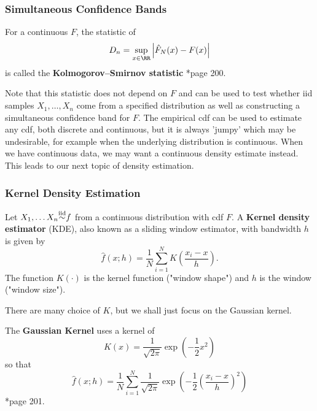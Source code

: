 \subsubsection*{Simultaneous Confidence Bands}


\begin{defe} \label{defe: TBD}
    For a continuous $F$, the statistic of
    \begin{equation*}
        D_n = \sup_{x \in \RR} \left| \hat{F}_N (x) - F(x) \right|
    \end{equation*}
    is called the {\bf Kolmogorov–Smirnov statistic} \cite{KroeseDirkP2013SMaC}*{page 200}.
\end{defe}

Note that this statistic does not depend on $F$ and can be used to test whether iid samples $X_1 , \ldots , X_n$ come from a specified distribution as well as constructing a simultaneous confidence band for $F$. The empirical cdf can be used to estimate any cdf, both discrete and continuous, but it is always 'jumpy' which may be undesirable, for example when the underlying distribution is continuous. When we have continuous data, we may want a continuous density estimate instead. This leads to our next topic of density estimation.

\subsubsection*{Kernel Density Estimation}

\begin{defe} \label{defe: KDE}
    Let $X_1 , \ldots X_n {\overset{\text{iid}}{\sim}} f$ from a continuous distribution with cdf $F$. A {\bf Kernel density estimator} (KDE), also known as a sliding window estimator, with bandwidth $h$ is given by
    \begin{equation*}
        \hat{f} (x;h) = \frac{1}{N} \sum_{i=1}^{N} K \left( \frac{x_i - x}{h} \right).
    \end{equation*}
    The function $K (\cdot)$ is the kernel function ("window shape") and $h$ is the window ("window size").
\end{defe}

There are many choice of $K$, but we shall just focus on the Gaussian kernel.

\begin{defe} \label{defe: gauss_kern}
    The {\bf Gaussian Kernel} uses a kernel of
    \begin{equation*}
        K(x) = \frac{1}{\sqrt{2 \pi}} \exp \left( - \frac{1}{2} x^2 \right)
    \end{equation*}
    so that
    \begin{equation*}
        \hat{f} (x;h) = \frac{1}{N} \sum_{i=1}^{N} \frac{1}{\sqrt{2 \pi}} \exp \left( - \frac{1}{2} \left( \frac{x_i - x}{h} \right)^2 \right)
    \end{equation*}
    \cite{KroeseDirkP2013SMaC}*{page 201}.
\end{defe}

